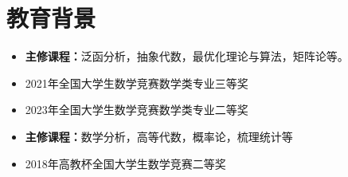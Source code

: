 \documentclass{resume}
\begin{document}




\section{教育背景}




\begin{itemize} [parsep=1ex]
  \item \textbf{主修课程：}泛函分析，抽象代数，最优化理论与算法，矩阵论等。
  \item 2021年全国大学生数学竞赛数学类专业三等奖
  \item 2023年全国大学生数学竞赛数学类专业二等奖
\end{itemize}


\begin{itemize} [parsep=1ex]
  \item \textbf{主修课程：}数学分析，高等代数，概率论，梳理统计等
  \item 2018年高教杯全国大学生数学竞赛二等奖
\end{itemize}
\end{document}
